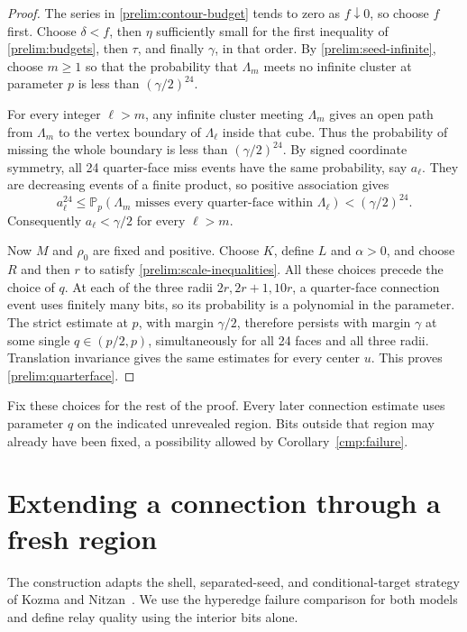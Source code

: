 \documentclass[11pt]{article}
\theoremstyle{definition}
\theoremstyle{remark}
\numberwithin{equation}{section}
\begin{document}
\begin{proof}
The series in \eqref{prelim:contour-budget} tends to zero as $f\downarrow0$,
so choose $f$ first. Choose $\delta<f$, then $\eta$ sufficiently small for
the first inequality of \eqref{prelim:budgets}, then $\tau$, and finally
$\gamma$, in that order. By \eqref{prelim:seed-infinite}, choose $m\ge1$
so that the probability that $\Lambda_m$ meets no infinite cluster at
parameter $p$ is less than $(\gamma/2)^{24}$.

For every integer $\ell>m$, any infinite cluster meeting $\Lambda_m$
gives an open path from $\Lambda_m$ to the vertex boundary of $\Lambda_\ell$
inside that cube. Thus the probability of missing the whole boundary is less
than $(\gamma/2)^{24}$. By signed coordinate symmetry, all 24 quarter-face
miss events have the same probability, say $a_\ell$. They are decreasing
events of a finite product, so positive association gives
\[
 a_\ell^{24}\le
 \mathbb P_p(\Lambda_m\text{ misses every quarter-face within }\Lambda_\ell)
 <(\gamma/2)^{24}.
\]
Consequently $a_\ell<\gamma/2$ for every $\ell>m$.

Now $M$ and $\rho_0$ are fixed and positive. Choose $K$, define $L$ and
$\alpha>0$, and choose $R$ and then $r$ to satisfy
\eqref{prelim:scale-inequalities}. All these choices precede the choice of
$q$. At each of the three radii $2r,2r+1,10r$, a quarter-face connection
event uses finitely many bits, so its probability is a polynomial in the
parameter. The strict estimate at $p$, with margin $\gamma/2$, therefore
persists with margin $\gamma$ at some single $q\in(p/2,p)$, simultaneously
for all 24 faces and all three radii. Translation invariance gives the same
estimates for every center $u$. This proves \eqref{prelim:quarterface}.
\end{proof}

Fix these choices for the rest of the proof. Every later connection estimate
uses parameter $q$ on the indicated unrevealed region. Bits outside that region
may already have been fixed, a possibility allowed by
Corollary~\ref{cmp:failure}.

\section{Extending a connection through a fresh region}
\label{sec:extension}

The construction adapts the shell, separated-seed, and conditional-target
strategy of Kozma and Nitzan~\cite[Section~4, Lemma~10]{KozmaNitzan2024}.
We use the hyperedge failure comparison for both models and define relay
quality using the interior bits alone.
\end{document}
